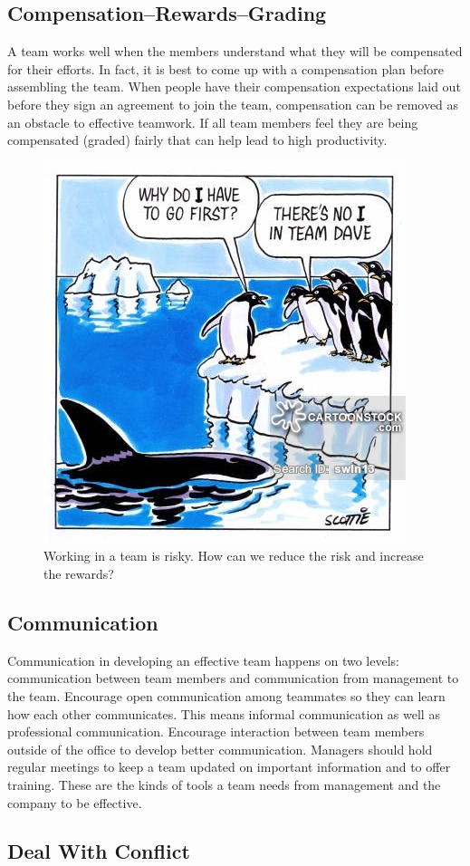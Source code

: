 \documentclass{article}\usepackage[]{graphicx}\usepackage[]{color}
\begin{document}
\subsection{Compensation--Rewards--Grading}
A team works well when the members understand what they will be compensated for their efforts. In fact, it is best to come up with a compensation plan before assembling the team. When people have their compensation expectations laid out before they sign an agreement to join the team, compensation can be removed as an obstacle to effective teamwork. If all team members feel they are being compensated (graded) fairly that can help lead to high productivity.

\begin{figure}
\centering
\includegraphics[width=.50\textwidth]{../figure/PenguinTeamWork.jpg}
\caption{Working in a team is risky. How can we reduce the risk and increase the rewards?}
\end{figure}

\subsection{Communication}
Communication in developing an effective team happens on two levels: communication between team members and communication from management to the team. Encourage open communication among teammates so they can learn how each other communicates. This means informal communication as well as professional communication. Encourage interaction between team members outside of the office to develop better communication. Managers should hold regular meetings to keep a team updated on important information and to offer training. These are the kinds of tools a team needs from management and the company to be effective.

\subsection{Deal With Conflict}
\end{document}
